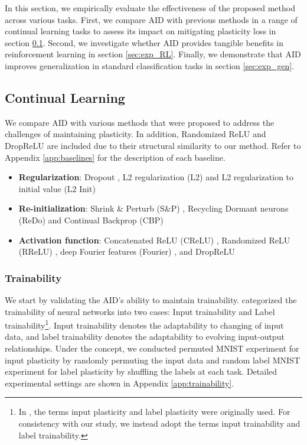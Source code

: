 




In this section, we empirically evaluate the effectiveness of the proposed method across various tasks.
First, we compare AID with previous methods in a range of continual learning tasks to assess its impact on mitigating plasticity loss in section \ref{sec:exp_CL}.
Second, we investigate whether AID provides tangible benefits in reinforcement learning in section \ref{sec:exp_RL}.
Finally, we demonstrate that AID improves generalization in standard classification tasks in section \ref{sec:exp_gen}.


\subsection{Continual Learning}
\label{sec:exp_CL}
We compare AID with various methods that were proposed to address the challenges of maintaining plasticity.
In addition, Randomized ReLU and DropReLU are included due to their structural similarity to our method.
Refer to Appendix \ref{app:baselines} for the description of each baseline.

\begin{itemize}
    \item \textbf{Regularization}: Dropout \cite{srivastava2014dropout}, L2 regularization (L2) \cite{krogh1991simple} and L2 regularization to initial value (L2 Init) \cite{kumar2023maintaining}
    \item \textbf{Re-initialization}: Shrink \& Perturb (S\&P) \cite{ash2020warm}, Recycling Dormant neurons (ReDo) \cite{sokar2023dormant} and Continual Backprop (CBP) \cite{dohare2024loss}
    \item \textbf{Activation function}: Concatenated ReLU (CReLU) \cite{abbas2023loss}, Randomized ReLU (RReLU) \cite{xu2015empirical}, deep Fourier features (Fourier) \cite{lewandowski2024plastic}, and DropReLU \cite{liang2021drop}
\end{itemize}


\subsubsection{Trainability}
\label{sec:trainability}
We start by validating the AID's ability to maintain trainability.
\citet{lee2024plastic} categorized the trainability of neural networks into two cases: Input trainability and Label trainability\footnote{In \citet{lee2024plastic}, the terms input plasticity and label plasticity were originally used. For consistency with our study, we instead adopt the terms input trainability and label trainability.}.
Input trainability denotes the adaptability to changing of input data, and label trainability denotes the adaptability to evolving input-output relationships.
Under the concept, we conducted permuted MNIST experiment for input plasticity by randomly permuting the input data and random label MNIST experiment for label plasticity by shuffling the labels at each task.
Detailed experimental settings are shown in Appendix \ref{app:trainability}.


